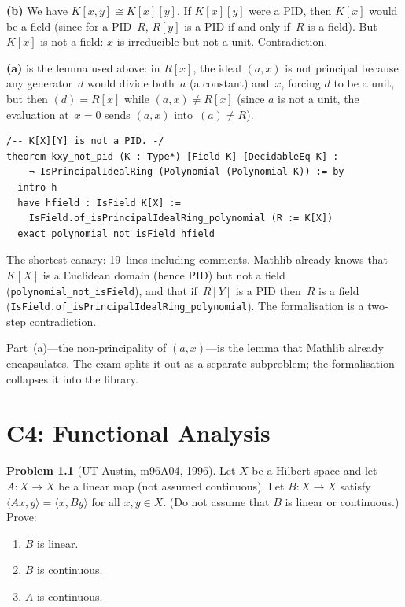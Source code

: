 \documentclass[12pt,oneside]{book}
\theoremstyle{plain}
\theoremstyle{definition}
\newtheorem{problem}{Problem}[chapter]
\theoremstyle{remark}
\begin{document}
\begin{proofbox}
\textbf{(b)} We have $K[x, y] \cong K[x][y]$. If $K[x][y]$ were a PID,
then $K[x]$ would be a field (since for a PID~$R$, $R[y]$ is a PID if
and only if~$R$ is a field). But $K[x]$ is not a field: $x$ is
irreducible but not a unit. Contradiction.

\medskip
\textbf{(a)} is the lemma used above: in $R[x]$, the ideal $(a, x)$ is
not principal because any generator~$d$ would divide both~$a$ (a
constant) and~$x$, forcing $d$ to be a unit, but then $(d) = R[x]$
while $(a, x) \ne R[x]$ (since $a$ is not a unit, the evaluation
at~$x = 0$ sends $(a, x)$ into~$(a) \ne R$).
\end{proofbox}

\begin{leanbox}
\begin{Verbatim}[fontsize=\small]
/-- K[X][Y] is not a PID. -/
theorem kxy_not_pid (K : Type*) [Field K] [DecidableEq K] :
    ¬ IsPrincipalIdealRing (Polynomial (Polynomial K)) := by
  intro h
  have hfield : IsField K[X] :=
    IsField.of_isPrincipalIdealRing_polynomial (R := K[X])
  exact polynomial_not_isField hfield
\end{Verbatim}
\end{leanbox}

\begin{notebox}
The shortest canary: 19~lines including comments. Mathlib already knows
that $K[X]$ is a Euclidean domain (hence PID) but not a field
(\texttt{polynomial\_not\_isField}), and that if~$R[Y]$ is a PID
then~$R$ is a field
(\texttt{IsField.of\_isPrincipalIdealRing\_polynomial}). The
formalisation is a two-step contradiction.

Part~(a)---the non-principality of $(a, x)$---is the lemma that
Mathlib already encapsulates. The exam splits it out as a separate
subproblem; the formalisation collapses it into the library.
\end{notebox}

\chapter{C4: Functional Analysis}\label{ch:c4}

\begin{problem}[UT Austin, m96A04, 1996]
Let $X$ be a Hilbert space and let $A : X \to X$ be a linear map (not
assumed continuous). Let $B : X \to X$ satisfy
$\langle Ax, y \rangle = \langle x, By \rangle$ for all $x, y \in X$.
(Do not assume that $B$ is linear or continuous.) Prove:
\begin{enumerate}[label=(\alph*)]
\item $B$ is linear.
\item $B$ is continuous.
\item $A$ is continuous.
\end{enumerate}
\end{problem}
\end{document}
